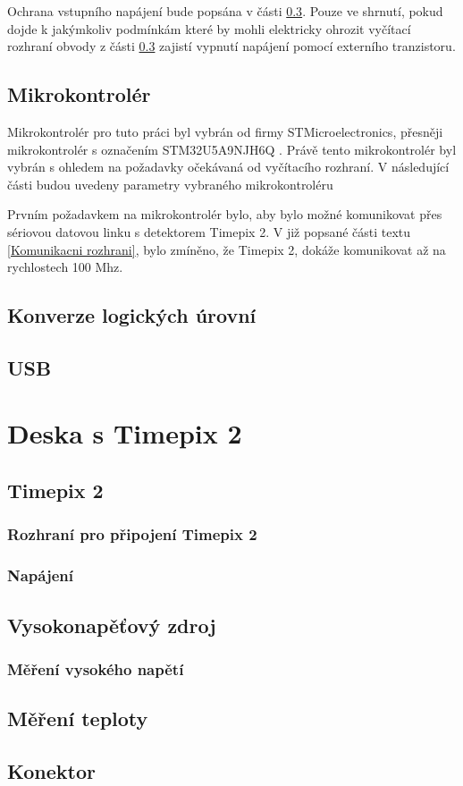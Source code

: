 	\par Ochrana vstupního napájení bude popsána v části \ref{USB}. Pouze ve shrnutí, pokud dojde k jakýmkoliv podmínkám které by mohli elektricky ohrozit vyčítací rozhraní obvody z části \ref{USB} zajistí vypnutí napájení pomocí externího tranzistoru.
	

	\subsection{Mikrokontrolér}
	Mikrokontrolér pro tuto práci byl vybrán od firmy STMicroelectronics, přesněji mikrokontrolér s označením STM32U5A9NJH6Q \cite{STM32U5A9}. Právě tento mikrokontrolér byl vybrán s ohledem na požadavky očekávaná od vyčítacího rozhraní. V následující části budou uvedeny parametry vybraného mikrokontroléru
	\par Prvním požadavkem na mikrokontrolér bylo, aby bylo možné komunikovat přes sériovou datovou linku s detektorem Timepix 2. V již popsané části textu \ref{Komunikacni rozhrani}, bylo zmíněno, že Timepix 2, dokáže komunikovat až na rychlostech 100 Mhz.  
	
	
	\subsection{Konverze logických úrovní}	
	\subsection{USB}
	\label{USB}

\section{Deska s Timepix 2}
	\subsection{Timepix 2}
	\subsubsection{Rozhraní pro připojení Timepix 2}
	\subsubsection{Napájení}
	\subsection{Vysokonapěťový zdroj}
		\subsubsection{Měření vysokého napětí}
	\subsection{Měření teploty}
	\subsection{Konektor}
	\label{konektor}
